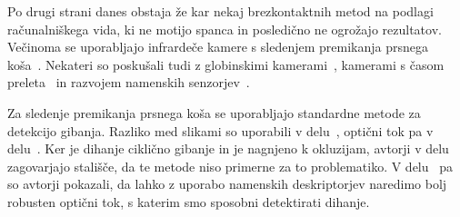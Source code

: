 Po drugi strani danes obstaja že kar nekaj brezkontaktnih metod na podlagi računalniškega vida, ki ne motijo spanca in posledično ne ogrožajo rezultatov. Večinoma se uporabljajo infrardeče kamere s sledenjem premikanja prsnega koša~\cite{sathyanarayana2015vision}. Nekateri so poskušali tudi z globinskimi kamerami~\cite{yang2014sleep}, kamerami s časom preleta~\cite{falie2009statistical} in razvojem namenskih senzorjev~\cite{takemura2005respiratory}.

Za sledenje premikanja prsnega koša se uporabljajo standardne metode za detekcijo gibanja. Razliko med slikami so uporabili v delu~\cite{nakai2000non}, optični tok pa v delu~\cite{nakajima2001development}. Ker je dihanje ciklično gibanje in je nagnjeno k okluzijam, avtorji v delu~\cite{wang2014unconstrained} zagovarjajo stališče, da te metode niso primerne za to problematiko. V delu~\cite{koporec2017observation} pa so avtorji pokazali, da lahko z uporabo namenskih deskriptorjev naredimo bolj robusten optični tok, s katerim smo sposobni detektirati dihanje.